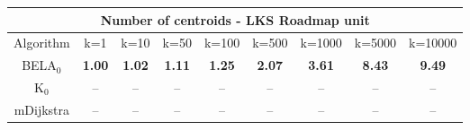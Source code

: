 \begin{tabular}{c|cccccccc}\toprule
\multicolumn{9}{c}{Number of centroids - LKS Roadmap unit}\\ \midrule
Algorithm & k=1 & k=10 & k=50 & k=100 & k=500 & k=1000 & k=5000 & k=10000 \\ \midrule
BELA$_0$ & \textbf{1.00} & \textbf{1.02} & \textbf{1.11} & \textbf{1.25} & \textbf{2.07} & \textbf{3.61} & \textbf{8.43} & \textbf{9.49} \\
K$_0$ & -- & -- & -- & -- & -- & -- & -- & -- \\
mDijkstra & -- & -- & -- & -- & -- & -- & -- & -- \\ \bottomrule 
\end{tabular}
